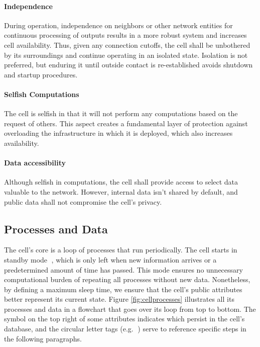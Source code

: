 \paragraph*{Independence} During operation, independence on neighbors or other network entities for continuous processing of outputs results in a more robust system and increases cell availability. Thus, given any connection cutoffs, the cell shall be unbothered by its surroundings and continue operating in an isolated state. Isolation is not preferred, but enduring it until outside contact is re-established avoids shutdown and startup procedures.

\paragraph*{Selfish Computations} The cell is selfish in that it will not perform any computations based on the request of others. This aspect creates a fundamental layer of protection against overloading the infrastructure in which it is deployed, which also increases availability.

\paragraph*{Data accessibility} Although selfish in computations, the cell shall provide access to select data valuable to the network. However, internal data isn't shared by default, and public data shall not compromise the cell's privacy.

\subsection{Processes and Data}

The cell's core is a loop of processes that run periodically. The cell starts in standby mode \textcircled{}, which is only left when new information arrives or a predetermined amount of time has passed. This mode ensures no unnecessary computational burden of repeating all processes without new data. Nonetheless, by defining a maximum sleep time, we ensure that the cell's public attributes better represent its current state. Figure \ref{fig:cellprocesses} illustrates all its processes and data in a flowchart that goes over its loop from top to bottom. The symbol on the top right of some attributes indicates which persist in the cell's database, and the circular letter tags (e.g. \textcircled{}) serve to reference specific steps in the following paragraphs.

